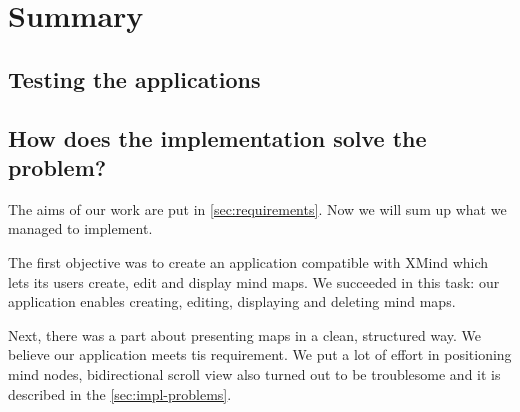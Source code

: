 %
%
%
%
%

\chapter{Summary}
\label{chap:summary}

\section{Testing the applications}
\label{summary-testing}


\section{How does the implementation solve the problem?}
\label{summary-how-solve}
The aims of our work are put in \cref{sec:requirements}. Now we will sum up what we managed to implement. 
 
The first objective was to create an application compatible with XMind which lets its users create, edit and display mind maps. We succeeded in this task: our application enables creating, editing, displaying and deleting mind maps.

Next, there was a part about presenting maps in a clean, structured way. We believe our application meets tis requirement. We put a lot of effort in positioning mind nodes, bidirectional scroll view also turned out to be troublesome and it is described in the \cref{sec:impl-problems}.

